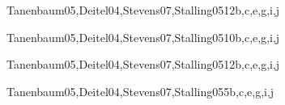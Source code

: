 \begin{syllabus}
\begin{unit}{\NCNetworkedApplicationsDef}{Tanenbaum05,Deitel04,Stevens07,Stalling05}{12}{b,c,e,g,i,j}
        \NCNetworkedApplicationsAllTopics
        \NCNetworkedApplicationsAllObjectives
\end{unit}

\begin{unit}{\NCNetworkManagementDef}{Tanenbaum05,Deitel04,Stevens07,Stalling05}{10}{b,c,e,g,i,j}
        \NCNetworkManagementAllTopics
        \NCNetworkManagementAllObjectives
\end{unit}

\begin{unit}{\NCMultimediaTechnologiesDef}{Tanenbaum05,Deitel04,Stevens07,Stalling05}{12}{b,c,e,g,i,j}
        \NCMultimediaTechnologiesAllTopics
        \NCMultimediaTechnologiesAllObjectives
\end{unit}

\begin{unit}{\NCMobileComputingDef}{Tanenbaum05,Deitel04,Stevens07,Stalling05}{5}{b,c,e,g,i,j}
        \NCMobileComputingAllTopics
        \NCMobileComputingAllObjectives
\end{unit}



\begin{coursebibliography}
\end{coursebibliography}

\end{syllabus}

%
